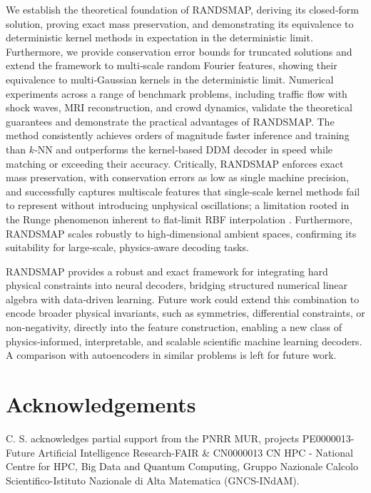 \documentclass{article}
\begin{document}
We establish the theoretical foundation of RANDSMAP, deriving its closed‑form solution, proving exact mass preservation, and demonstrating its equivalence to deterministic kernel methods in expectation in the deterministic limit. Furthermore, we provide conservation error bounds for truncated solutions and extend the framework to multi‑scale random Fourier features, showing their equivalence to multi‑Gaussian kernels in the deterministic limit. Numerical experiments across a range of benchmark problems, including traffic flow with shock waves, MRI reconstruction, and crowd dynamics, validate the theoretical guarantees and demonstrate the practical advantages of RANDSMAP. The method consistently achieves orders of magnitude faster inference and training than $k$‑NN and outperforms the kernel‑based DDM decoder in speed while matching or exceeding their accuracy. Critically, RANDSMAP enforces exact mass preservation, with conservation errors as low as single machine precision, and successfully captures multiscale features that single‑scale kernel methods fail to represent without introducing unphysical oscillations; a limitation rooted in the Runge phenomenon inherent to flat‑limit RBF interpolation \cite{fornberg2007runge}. Furthermore, RANDSMAP scales robustly to high‑dimensional ambient spaces, confirming its suitability for large‑scale, physics‑aware decoding tasks.

RANDSMAP provides a robust and exact framework for integrating hard physical constraints into neural decoders, bridging structured numerical linear algebra with data‑driven learning. Future work could extend this combination to encode broader physical invariants, such as symmetries, differential constraints, or non‑negativity, directly into the feature construction, enabling a new class of physics‑informed, interpretable, and scalable scientific machine learning decoders. A comparison with autoencoders in similar problems is left for future work.
\section*{Acknowledgements}
C. S. acknowledges partial support from the PNRR MUR, projects PE0000013-Future Artificial Intelligence Research-FAIR \& CN0000013 CN HPC - National Centre for HPC, Big Data and Quantum Computing, Gruppo Nazionale Calcolo Scientifico-Istituto Nazionale di Alta Matematica (GNCS-INdAM).
\end{document}
